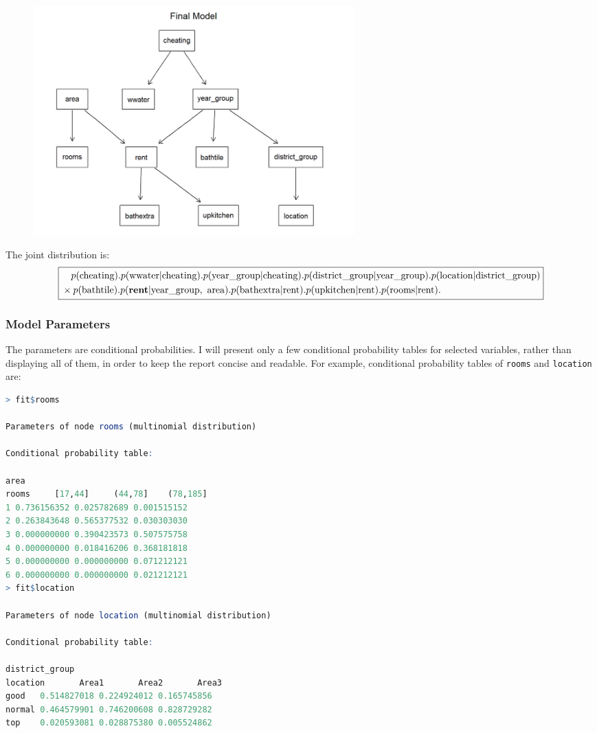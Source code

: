 \documentclass[15pt,a4paper]{report}
\begin{document}
\begin{figure}[H]
	\centering \includegraphics[width=0.6\textwidth]{unnamed-chunk-33-1.png}
\end{figure}
The joint distribution is:
\[
\boxed{\begin{aligned}
		&\quad p(\text{cheating}).p(\text{wwater|cheating}).p(\text{year\_group|cheating}).p(\text{district\_group|year\_group}).p(\text{location|district\_group})\\
		&\times p(\text{bathtile}).p(\textbf{rent}|\text{year\_group,\, area}).p(\text{bathextra|rent}).p(\text{upkitchen|rent}).p(\text{rooms|rent}).
\end{aligned}}
\]
\subsubsection*{Model Parameters}
The parameters are conditional probabilities. I will present only a few conditional probability tables for selected variables, rather than displaying all of them, in order to keep the report concise and readable. For example, conditional probability tables of \lstinline[language=R]|rooms| and \lstinline[language=R]|location| are:
\begin{lstlisting}[language=R]
> fit$rooms

Parameters of node rooms (multinomial distribution)

Conditional probability table:

area
rooms     [17,44]     (44,78]    (78,185]
1 0.736156352 0.025782689 0.001515152
2 0.263843648 0.565377532 0.030303030
3 0.000000000 0.390423573 0.507575758
4 0.000000000 0.018416206 0.368181818
5 0.000000000 0.000000000 0.071212121
6 0.000000000 0.000000000 0.021212121
> fit$location

Parameters of node location (multinomial distribution)

Conditional probability table:

district_group
location       Area1       Area2       Area3
good   0.514827018 0.224924012 0.165745856
normal 0.464579901 0.746200608 0.828729282
top    0.020593081 0.028875380 0.005524862
\end{lstlisting}
\end{document}

